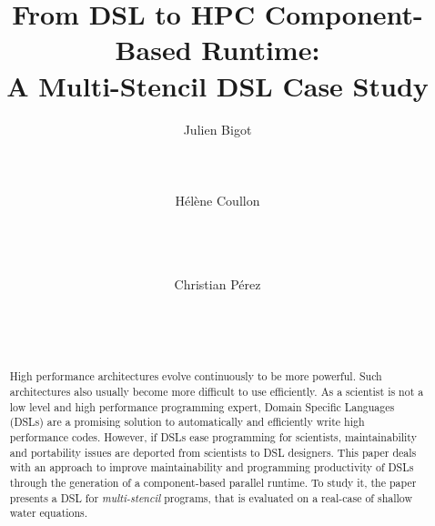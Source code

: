 \documentclass{acm_proc_article-sp}
\begin{document}
\title{From DSL to HPC Component-Based Runtime:\\ A Multi-Stencil DSL Case Study}

\author{
\alignauthor
Julien Bigot\\
       \\
       \\
       \\ %
\alignauthor
H\'el\`ene Coullon\\
       \\
       \\
       \\
\and
\alignauthor
Christian P\'erez\\
       \\
       \\
       \\
}

\maketitle

\begin{abstract}
  High performance architectures evolve continuously to be more powerful. Such architectures also usually become more difficult to use efficiently. As a scientist is not a low level and high performance programming expert, Domain Specific Languages (DSLs) are a promising solution to automatically and efficiently write high performance codes. However, if DSLs ease programming for scientists, maintainability and portability issues are deported from scientists to DSL designers. This paper deals with an approach to improve maintainability and programming productivity of DSLs through the generation of a component-based parallel runtime. To study it, the paper presents a  DSL for \emph{multi-stencil} programs, that is evaluated on a real-case of shallow water equations.
\end{abstract}

\end{document}
